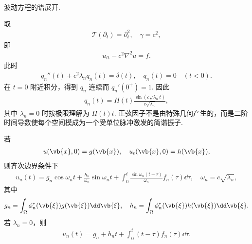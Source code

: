 \begin{exbox}
	波动方程的谱展开.
	
	取
	\begin{align*}
		\mathcal{T}(\partial_t)=\partial_t^2,
		\quad \gamma=c^2,
	\end{align*}
	即
	\begin{align*}
		u_{tt}-c^2\nabla^2u=f.
	\end{align*}
	此时
	\begin{align*}
		q_n''(t)+c^2\lambda_nq_n(t)=\delta(t),
		\quad q_n(t)=0\quad(t<0).
	\end{align*}
	在 \(t=0\) 附近积分，得到 \(q_n\) 连续而 \(q_n'(0^+)=1\). 因此
	\begin{align*}
		q_n(t)=H(t)\frac{\sin(c\sqrt{\lambda_n}t)}{c\sqrt{\lambda_n}},
	\end{align*}
	其中 \(\lambda_n=0\) 时按极限理解为 \(H(t)t\). 正弦因子不是由特殊几何产生的，而是二阶时间导数使每个空间模成为一个受单位脉冲激发的简谐振子.
	
	若
	\begin{align*}
		u(\vb{x},0)=g(\vb{x}),
		\quad u_t(\vb{x},0)=h(\vb{x}),
	\end{align*}
	则齐次边界条件下
	\begin{align*}
		u_n(t)=g_n\cos\omega_nt+\frac{h_n}{\omega_n}\sin\omega_nt
		+\int_0^t\frac{\sin\omega_n(t-\tau)}{\omega_n}f_n(\tau)\dd\tau,
		\quad \omega_n=c\sqrt{\lambda_n},
	\end{align*}
	其中
	\begin{align*}
		g_n=\int_\Omega\phi_n^*(\vb{\xi})g(\vb{\xi})\dd\vb{\xi},
		\quad
		h_n=\int_\Omega\phi_n^*(\vb{\xi})h(\vb{\xi})\dd\vb{\xi}.
	\end{align*}
	若 \(\lambda_n=0\)，则
	\begin{align*}
		u_n(t)=g_n+h_nt+\int_0^t(t-\tau)f_n(\tau)\dd\tau.
	\end{align*}
\end{exbox}

